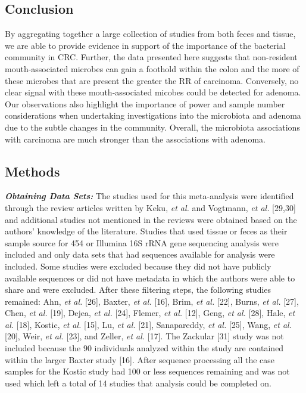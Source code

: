 \documentclass[12pt,]{article}
\begin{document}
\newpage

\subsection{Conclusion}\label{conclusion}

By aggregating together a large collection of studies from both feces
and tissue, we are able to provide evidence in support of the importance
of the bacterial community in CRC. Further, the data presented here
suggests that non-resident mouth-associated microbes can gain a foothold
within the colon and the more of these microbes that are present the
greater the RR of carcinoma. Conversely, no clear signal with these
mouth-associated micobes could be detected for adenoma. Our observations
also highlight the importance of power and sample number considerations
when undertaking investigations into the microbiota and adenoma due to
the subtle changes in the community. Overall, the microbiota
associations with carcinoma are much stronger than the associations with
adenoma.

\newpage

\subsection{Methods}\label{methods}

\textbf{\emph{Obtaining Data Sets:}} The studies used for this
meta-analysis were identified through the review articles written by
Keku, \emph{et al.} and Vogtmann, \emph{et al.} {[}29,30{]} and
additional studies not mentioned in the reviews were obtained based on
the authors' knowledge of the literature. Studies that used tissue or
feces as their sample source for 454 or Illumina 16S rRNA gene
sequencing analysis were included and only data sets that had sequences
available for analysis were included. Some studies were excluded because
they did not have publicly available sequences or did not have metadata
in which the authors were able to share and were excluded. After these
filtering steps, the following studies remained: Ahn, \emph{et al.}
{[}26{]}, Baxter, \emph{et al.} {[}16{]}, Brim, \emph{et al.} {[}22{]},
Burns, \emph{et al.} {[}27{]}, Chen, \emph{et al.} {[}19{]}, Dejea,
\emph{et al.} {[}24{]}, Flemer, \emph{et al.} {[}12{]}, Geng, \emph{et
al.} {[}28{]}, Hale, \emph{et al.} {[}18{]}, Kostic, \emph{et al.}
{[}15{]}, Lu, \emph{et al.} {[}21{]}, Sanapareddy, \emph{et al.}
{[}25{]}, Wang, \emph{et al.} {[}20{]}, Weir, \emph{et al.} {[}23{]},
and Zeller, \emph{et al.} {[}17{]}. The Zackular {[}31{]} study was not
included because the 90 individuals analyzed within the study are
contained within the larger Baxter study {[}16{]}. After sequence
processing all the case samples for the Kostic study had 100 or less
sequences remaining and was not used which left a total of 14 studies
that analysis could be completed on.
\end{document}
